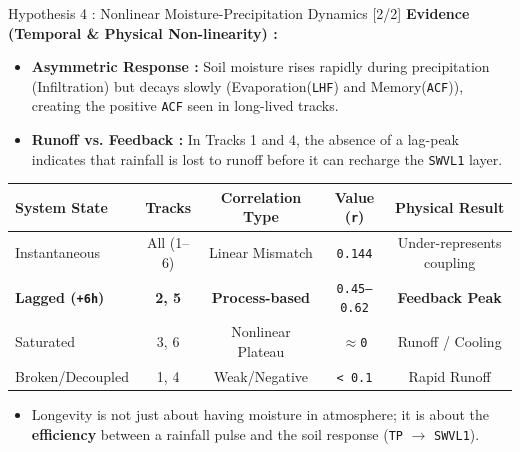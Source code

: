 \begin{frame}{Hypothesis 4 : Nonlinear Moisture-Precipitation Dynamics [2/2]}
	\footnotesize
	\textbf{Evidence (Temporal \& Physical Non-linearity) :}
	\begin{itemize}
		\item \textbf{Asymmetric Response :} Soil moisture rises rapidly during precipitation (Infiltration) but decays slowly (Evaporation(\texttt{LHF}) and Memory(\texttt{ACF})), creating the positive \texttt{ACF} seen in long-lived tracks.
		\item \textbf{Runoff vs. Feedback :} In Tracks 1 and 4, the absence of a lag-peak indicates that rainfall is lost to runoff before it can recharge the \texttt{SWVL1} layer. \cite{clapp1978empirical}
	\end{itemize}

	\vspace{0.1cm}
	\begin{center}
		\begin{tabular}{lcccc}
			\toprule
			\textbf{System State}          & \textbf{Tracks} & \textbf{Correlation Type} & \textbf{Value (\texttt{r})} & \textbf{Physical Result}  \\
			\midrule
			Instantaneous                  & All (1--6)      & Linear Mismatch           & \texttt{0.144}              & Under-represents coupling \\
			\textbf{Lagged (\texttt{+6h})} & \textbf{2, 5}   & \textbf{Process-based}    & \texttt{0.45--0.62}         & \textbf{Feedback Peak}    \\
			Saturated                      & 3, 6            & Nonlinear Plateau         & \texttt{$\approx$0}         & Runoff / Cooling          \\
			Broken/Decoupled               & 1, 4            & Weak/Negative             & \texttt{< 0.1}              & Rapid Runoff              \\
			\bottomrule
		\end{tabular}
	\end{center}

	\vspace{0.3cm}
	\footnotesize
	\begin{itemize}
		\item Longevity is not just about having moisture in atmosphere; it is about the \textbf{efficiency} between a rainfall pulse and the soil response (\texttt{TP} $\rightarrow$ \texttt{SWVL1}).
	\end{itemize}
\end{frame}

